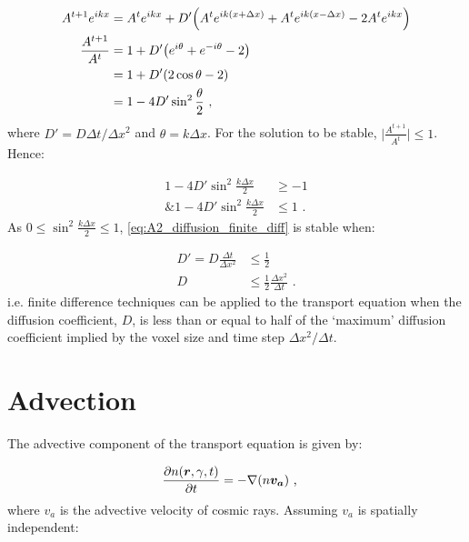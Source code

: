 \begin{equation}
    \begin{aligned}
    A^{t+1}e^{ikx}&=A^te^{ikx}+D'\qty(A^{t}e^{ik\qty(x+\Delta x)}+A^{t}e^{ik\qty(x-\Delta x)}-2A^te^{ikx}) \\
    \frac{A^{t+1}}{A^t}&=1+D'\qty(e^{i\theta}+e^{-i\theta}-2) \\
    &=1+D'\qty(2\cos\theta-2) \\
    &=1-4D'\sin^2\frac{\theta}{2}\text{ ,} 
    \end{aligned}
\end{equation}
\noindent where $D'=D\Delta t/\Delta x^2$ and $\theta=k\Delta x$. For the solution to be stable, $\lvert \frac{A^{t+1}}{A^t}\rvert\leq 1$. Hence:

\begin{equation}
    \begin{aligned}
    1-4D'\sin^2\frac{k\Delta x}{2} &\geq -1 \\
    \text{\& } 1-4D'\sin^2\frac{k\Delta x}{2} &\leq 1 \text{ .} 
    \end{aligned} \label{eq:A2_diffusion_finite_stability_cond}
\end{equation}
\noindent As $0\leq \sin^2\frac{k\Delta x}{2}\leq 1$, \autoref{eq:A2_diffusion_finite_diff} is stable when:

\begin{equation}
    \begin{aligned}
    D'=D\frac{\Delta t}{\Delta x^2}&\leq \frac{1}{2} \\
    D&\leq \frac{1}{2}\frac{\Delta x^2}{\Delta t}\text{ .} 
    \end{aligned}
\end{equation}
\noindent i.e. finite difference techniques can be applied to the transport equation when the diffusion coefficient, $D$, is less than or equal to half of the `maximum' diffusion coefficient implied by the voxel size and time step $\Delta x^2/\Delta t$.

\section{Advection}

The advective component of the transport equation is given by:

\begin{equation}
    \begin{aligned}
        \pdv{n\qty(\boldsymbol{r},\gamma,t)}{t}&=-\nabla\qty(n\boldsymbol{v_a})\text{ ,} 
    \end{aligned}
\end{equation}
\noindent where $v_a$ is the advective velocity of cosmic rays. Assuming $v_a$ is spatially independent:

